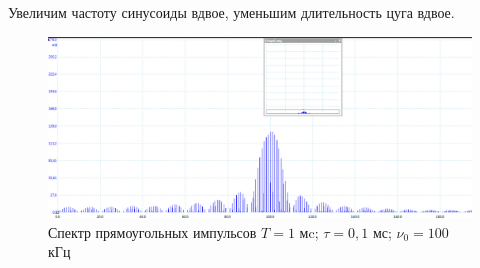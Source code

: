\documentclass[a4paper,12pt]{article}
\begin{document}
Увеличим частоту синусоиды вдвое, уменьшим длительность цуга вдвое.
\begin{figure}[H]\label{fig: 100kHz_1ms_10N}
    \centering
    \includegraphics[width =\textwidth]{100kHz_1ms_10N.png}
        \caption{Спектр прямоугольных импульсов $T = 1$ мc; $\tau = 0,1$ мс; $\nu_0 = 100$ кГц}
\end{figure}
\end{document}
